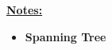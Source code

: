 \documentclass[12pt]{article}
\begin{document}
\begin{enumerate}[1.]










    \bigskip

    \underline{\textbf{Notes:}}

    \bigskip

    \begin{itemize}
        \item \textbf{Spanning Tree}


\end{itemize}
\end{enumerate}
\end{document}
